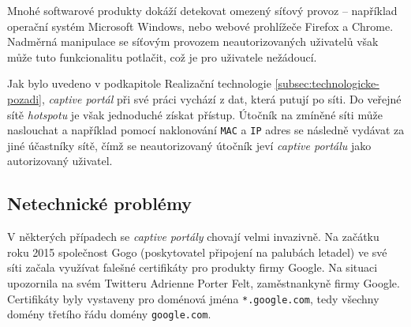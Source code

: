 \documentclass[thesis=M,czech]{FITthesis}[2012/10/20]
\begin{document}

Mnohé softwarové produkty dokáží detekovat omezený síťový provoz -- například operační systém Microsoft Windows, nebo webové prohlížeče Firefox a Chrome. Nadměrná manipulace se síťovým provozem neautorizovaných uživatelů však může tuto funkcionalitu potlačit, což je pro uživatele nežádoucí.




Jak bylo uvedeno v podkapitole Realizační technologie \ref{subsec:technologicke-pozadi}, \textit{captive portál} při své práci vychází z dat, která putují po síti. Do veřejné sítě \textit{hotspotu} je však jednoduché získat přístup. Útočník na zmíněné síti může naslouchat a například pomocí naklonování \texttt{MAC} a \texttt{IP} adres se následně vydávat za jiné účastníky sítě, čímž se neautorizovaný útočník jeví \textit{captive portálu} jako autorizovaný uživatel.


% 





\subsection{Netechnické problémy}
\label{subsec:netechnicke-problemy}

V některých případech se \textit{captive portály} chovají velmi invazivně. Na začátku roku 2015 společnost Gogo (poskytovatel připojení na palubách letadel) ve své síti začala využívat falešné certifikáty pro produkty firmy Google. Na situaci upozornila na svém Twitteru\cite{gogo-fakecerts} Adrienne Porter Felt, zaměstnankyně firmy Google. Certifikáty byly vystaveny pro doménová jména \texttt{*.google.com}, tedy všechny domény třetího řádu domény \texttt{google.com}.
\end{document}
